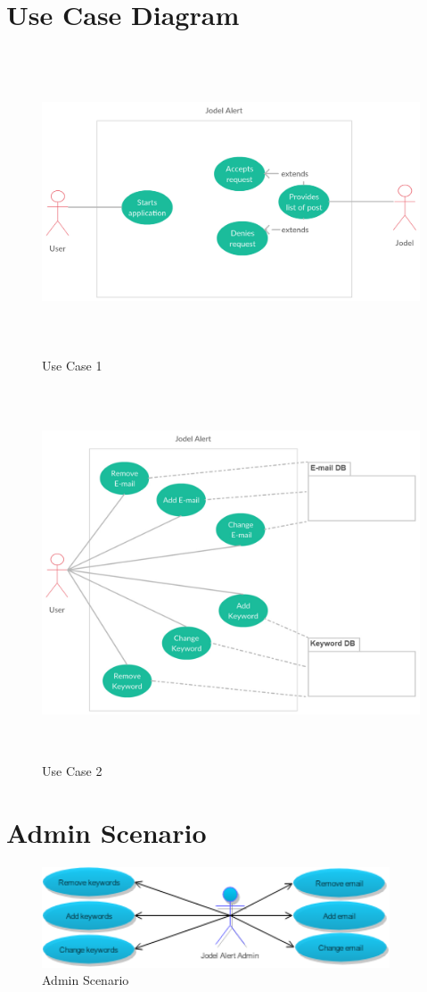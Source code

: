 \documentclass[a4paper,12pt]{article}
\begin{document}
\section{Use Case Diagram}
\begin{figure}[!h]
	\centering
	\includegraphics[height=9cm]{img/Use_case_diagram1-JodelAlert.pdf}
	\caption{Use Case 1}
	\label{Participating objects}
\end{figure}
\begin{figure}[!h]
	\centering
	\includegraphics[height=11cm]{img/Use_case_diagram2-JodelAlert.pdf}
	\caption{Use Case 2}
	\label{Participating objects}
\end{figure}
\section{Admin Scenario}
\begin{figure}[!h]
	\centering
	\includegraphics[height=3cm]{img/scenarioadmin.png}
	\caption{Admin Scenario}
	\label{Participating objects}
\end{figure}
\end{document}
